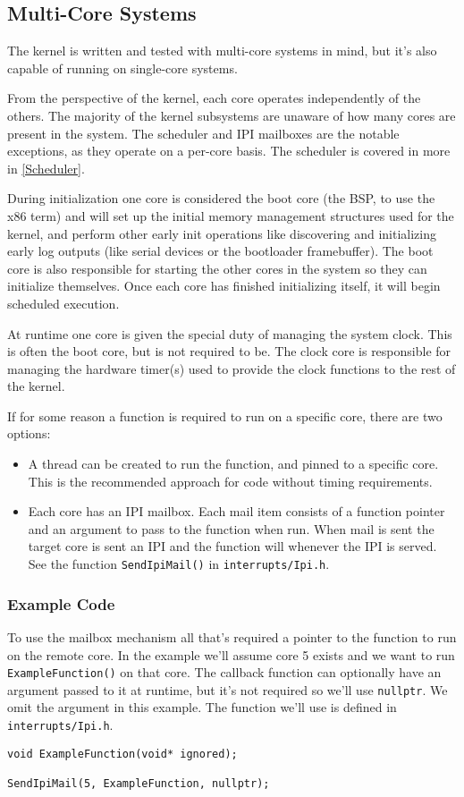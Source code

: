 \subsection{Multi-Core Systems}
The kernel is written and tested with multi-core systems in mind, but it's also capable of running on single-core systems. 

From the perspective of the kernel, each core operates independently of the others. The majority of the kernel subsystems are unaware of how many cores are present in the system. The scheduler and IPI mailboxes are the notable exceptions, as they operate on a per-core basis. The scheduler is covered in more in \autoref{Scheduler}.

During initialization one core is considered the boot core (the BSP, to use the x86 term) and will set up the initial memory management structures used for the kernel, and perform other early init operations like discovering and initializing early log outputs (like serial devices or the bootloader framebuffer). The boot core is also responsible for starting the other cores in the system so they can initialize themselves. Once each core has finished initializing itself, it will begin scheduled execution. 

At runtime one core is given the special duty of managing the system clock. This is often the boot core, but is not required to be. The clock core is responsible for managing the hardware timer(s) used to provide the clock functions to the rest of the kernel.

If for some reason a function is required to run on a specific core, there are two options:
\begin{itemize}
    \item A thread can be created to run the function, and pinned to a specific core. This is the recommended approach for code without timing requirements.
    \item Each core has an IPI mailbox. Each mail item consists of a function pointer and an argument to pass to the function when run. When mail is sent the target core is sent an IPI and the function will whenever the IPI is served. See the function \verb|SendIpiMail()| in \verb|interrupts/Ipi.h|.
\end{itemize}

\subsubsection{Example Code}
To use the mailbox mechanism all that's required a pointer to the function to run on the remote core. In the example we'll assume core 5 exists and we want to run \verb|ExampleFunction()| on that core. The callback function can optionally have an argument passed to it at runtime, but it's not required so we'll use \verb|nullptr|. We omit the argument in this example. The function we'll use is defined in \verb|interrupts/Ipi.h|.

\begin{verbatim}
void ExampleFunction(void* ignored);

SendIpiMail(5, ExampleFunction, nullptr);
\end{verbatim}
